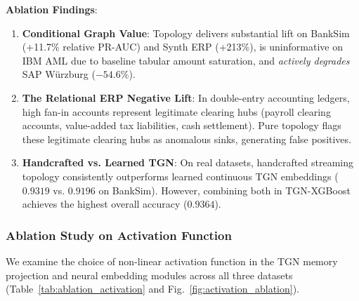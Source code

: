 \documentclass[journal]{IEEEtran}
\begin{document}
\textbf{Ablation Findings}:
\begin{enumerate}
    \item \textbf{Conditional Graph Value}: Topology delivers substantial lift on BankSim (+11.7\% relative PR-AUC) and Synth ERP (+213\%), is uninformative on IBM AML due to baseline tabular amount saturation, and \emph{actively degrades} SAP W{\"u}rzburg ($-54.6\%$).
    \item \textbf{The Relational ERP Negative Lift}: In double-entry accounting ledgers, high fan-in accounts represent legitimate clearing hubs (payroll clearing accounts, value-added tax liabilities, cash settlement). Pure topology flags these legitimate clearing hubs as anomalous sinks, generating false positives.
    \item \textbf{Handcrafted vs. Learned TGN}: On real datasets, handcrafted streaming topology consistently outperforms learned continuous TGN embeddings ($0.9319$ vs. $0.9196$ on BankSim). However, combining both in TGN-XGBoost achieves the highest overall accuracy ($0.9364$).
\end{enumerate}

\subsubsection{Ablation Study on Activation Function}\label{sec:ablation_activation}
We examine the choice of non-linear activation function in the TGN memory projection and neural embedding modules across all three datasets (Table~\ref{tab:ablation_activation} and Fig.~\ref{fig:activation_ablation}).

\begin{table}[t]
\centering
\caption{Ablation Study on Activation Function: Impact on Test PR-AUC and Optimization Stability.}
\label{tab:ablation_activation}
\end{table}
\end{document}
